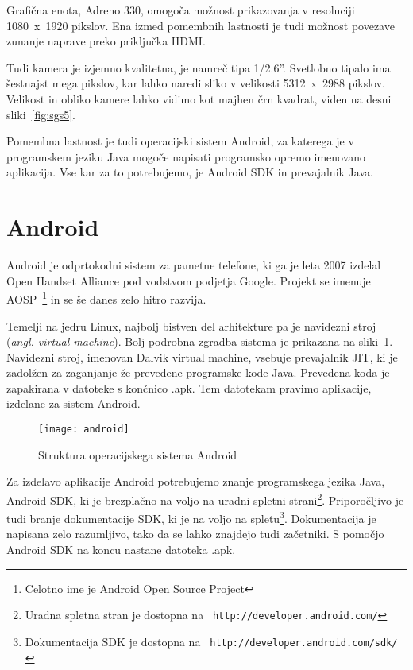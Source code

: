 Grafična enota, Adreno 330, omogoča možnost prikazovanja v resoluciji
1080~x~1920 pikslov. Ena izmed pomembnih lastnosti je tudi možnost povezave
zunanje naprave preko priključka HDMI.

Tudi kamera je  izjemno kvalitetna, je namreč tipa 1/2.6''. Svetlobno tipalo
ima šestnajst mega pikslov, kar lahko naredi sliko v velikosti 5312~x~2988
pikslov. Velikost in obliko kamere lahko vidimo kot majhen črn kvadrat, viden
na desni sliki~\ref{fig:sgs5}.

Pomembna lastnost je tudi operacijski sistem Android, za katerega je v
programskem jeziku Java mogoče napisati programsko opremo imenovano
aplikacija. Vse kar za to potrebujemo, je Android SDK in prevajalnik Java.


\section{Android}
\label{sec:android}
Android je odprtokodni sistem za pametne telefone, ki ga je leta 2007 izdelal
Open Handset Alliance pod vodstvom podjetja Google. Projekt se imenuje
AOSP~\footnote{Celotno ime je Android Open Source Project} in se še danes zelo
hitro razvija.

Temelji na jedru Linux, najbolj bistven del arhitekture pa je navidezni stroj
(\textit{angl. virtual machine}). Bolj podrobna zgradba sistema je prikazana
na sliki~\ref{picAndroid}. Navidezni stroj, imenovan Dalvik virtual machine,
vsebuje prevajalnik JIT, ki je zadolžen za zaganjanje že prevedene programske
kode Java. Prevedena koda je zapakirana v datoteke s končnico .apk. Tem
datotekam pravimo aplikacije, izdelane za sistem Android.

\begin{figure}
    \centering
    \texttt{[image: android]}
    \caption{Struktura operacijskega sistema Android~\cite{wiki:Android}}
    \label{picAndroid}
\end{figure}

Za izdelavo aplikacije Android potrebujemo znanje programskega jezika Java,
Android SDK, ki je brezplačno na voljo na uradni spletni
strani\footnote{Uradna spletna stran je dostopna na {\tt
http://developer.android.com/}}. Priporočljivo je tudi branje dokumentacije
SDK, ki je na voljo na spletu\footnote{Dokumentacija SDK je dostopna na {\tt
http://developer.android.com/sdk/}}. Dokumentacija je napisana zelo
razumljivo, tako da se lahko znajdejo tudi začetniki. S pomočjo Android SDK na
koncu nastane datoteka .apk.


